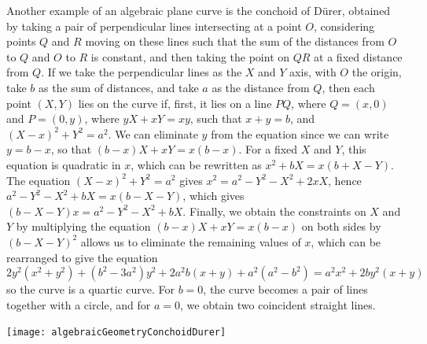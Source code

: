 \begin{example}
    Another example of an algebraic plane curve is the conchoid of D\"{u}rer, obtained by taking a pair of perpendicular lines intersecting at a point $O$, considering points $Q$ and $R$ moving on these lines such that the sum of the distances from $O$ to $Q$ and $O$ to $R$ is constant, and then taking the point on $QR$ at a fixed distance from $Q$. If we take the perpendicular lines as the $X$ and $Y$ axis, with $O$ the origin, take $b$ as the sum of distances, and take $a$ as the distance from $Q$, then each point $(X,Y)$ lies on the curve if, first, it lies on a line $PQ$, where $Q = (x,0)$ and $P = (0,y)$, where $yX + xY = xy$, such that $x + y = b$, and $(X - x)^2 + Y^2 = a^2$. We can eliminate $y$ from the equation since we can write $y = b -x$, so that $(b-x)X + xY = x(b-x)$. For a fixed $X$ and $Y$, this equation is quadratic in $x$, which can be rewritten as $x^2 + bX = x(b + X - Y)$. The equation $(X - x)^2 + Y^2 = a^2$ gives $x^2 = a^2 - Y^2 - X^2 + 2xX$, hence $a^2 - Y^2 - X^2 + bX = x(b - X - Y)$, which gives $(b - X - Y)x = a^2 - Y^2 - X^2 + bX$. Finally, we obtain the constraints on $X$ and $Y$ by multiplying the equation $(b - x)X + xY = x(b - x)$ on both sides by $(b - X - Y)^2$ allows us to eliminate the remaining values of $x$, which can be rearranged to give the equation
    \[ 2y^2(x^2 + y^2) + (b^2 - 3a^2)y^2 + 2a^2b(x + y) + a^2(a^2 - b^2) = a^2x^2 + 2by^2(x + y) \]
    so the curve is a quartic curve. For $b = 0$, the curve becomes a pair of lines together with a circle, and for $a = 0$, we obtain two coincident straight lines.
    \begin{center}
        \texttt{[image: algebraicGeometryConchoidDurer]}
    \end{center}
\end{example}

